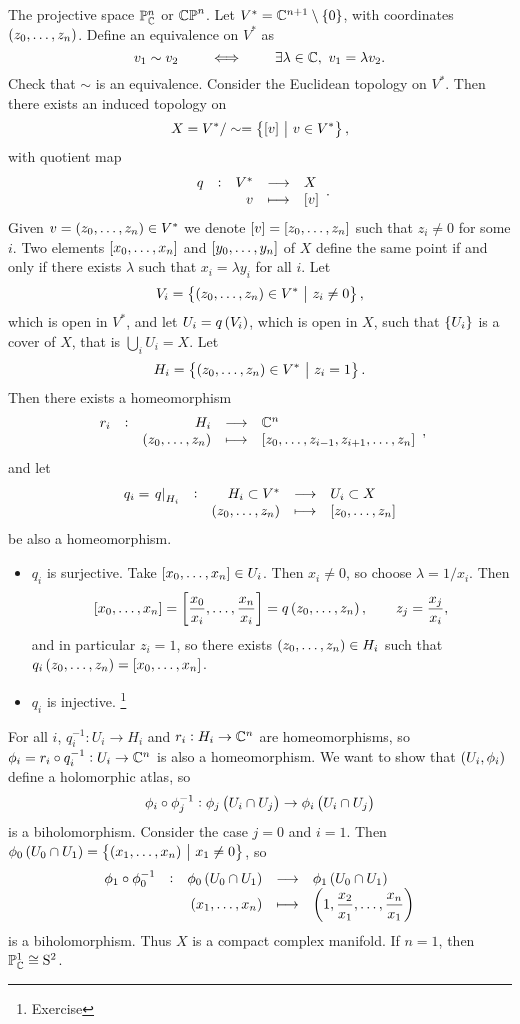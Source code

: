 \begin{example}
The projective space $ \mathbb{P}_{\mathbb{C}}^n $ or $ \mathbb{CP}^n $. Let $ V^* = \CC^{n + 1} \setminus \cbr{0} $, with coordinates $ \br{z_0, \dots, z_n} $. Define an equivalence on $ V^* $ as
$$ v_1 \sim v_2 \qquad \iff \qquad \exists \lambda \in \mathbb{C}, \ v_1 = \lambda v_2. $$
Check that $ \sim $ is an equivalence. Consider the Euclidean topology on $ V^* $. Then there exists an induced topology on
$$ X = V^* / \sim = \cbr{\sbr{v} \st v \in V^*}, $$
with quotient map
$$ \function[q]{V^*}{X}{v}{\sbr{v}}. $$
Given $ v = \br{z_0, \dots, z_n} \in V^* $ we denote $ \sbr{v} = \sbr{z_0, \dots, z_n} $ such that $ z_i \ne 0 $ for some $ i $. Two elements $ \sbr{x_0, \dots, x_n} $ and $ \sbr{y_0, \dots, y_n} $ of $ X $ define the same point if and only if there exists $ \lambda $ such that $ x_i = \lambda y_i $ for all $ i $. Let
$$ V_i = \cbr{\br{z_0, \dots, z_n} \in V^* \st z_i \ne 0}, $$
which is open in $ V^* $, and let $ U_i = q\br{V_i} $, which is open in $ X $, such that $ \cbr{U_i} $ is a cover of $ X $, that is $ \bigcup_i U_i = X $. Let
$$ H_i = \cbr{\br{z_0, \dots, z_n} \in V^* \st z_i = 1}. $$
Then there exists a homeomorphism
$$ \function[r_i]{H_i}{\CC^n}{\br{z_0, \dots, z_n}}{\sbr{z_0, \dots, z_{i - 1}, z_{i + 1}, \dots, z_n}}, $$
and let
$$ \function[q_i = \eval{q}_{H_i}]{H_i \subset V^*}{U_i \subset X}{\br{z_0, \dots, z_n}}{\sbr{z_0, \dots, z_n}} $$
be also a homeomorphism.

\pagebreak

\begin{itemize}
\item $ q_i $ is surjective. Take $ \sbr{x_0, \dots, x_n} \in U_i $. Then $ x_i \ne 0 $, so choose $ \lambda = 1 / x_i $. Then
$$ \sbr{x_0, \dots, x_n} = \sbr{\dfrac{x_0}{x_i}, \dots, \dfrac{x_n}{x_i}} = q\br{z_0, \dots, z_n}, \qquad z_j = \dfrac{x_j}{x_i}, $$
and in particular $ z_i = 1 $, so there exists $ \br{z_0, \dots, z_n} \in H_i $ such that $ q_i\br{z_0, \dots, z_n} = \sbr{x_0, \dots, x_n} $.
\item $ q_i $ is injective. \footnote{Exercise}
\end{itemize}
For all $ i $, $ q_i^{-1} : U_i \to H_i $ and $ r_i : H_i \to \mathbb{C}^n $ are homeomorphisms, so $ \phi_i = r_i \circ q_i^{-1} : U_i \to \mathbb{C}^n $ is also a homeomorphism. We want to show that $ \br{U_i, \phi_i} $ define a holomorphic atlas, so
$$ \phi_i \circ \phi_j^{-1} : \phi_j\br{U_i \cap U_j} \to \phi_i\br{U_i \cap U_j} $$
is a biholomorphism. Consider the case $ j = 0 $ and $ i = 1 $. Then $ \phi_0\br{U_0 \cap U_1} = \cbr{\br{x_1, \dots, x_n} \st x_1 \ne 0} $, so
$$ \function[\phi_1 \circ \phi_0^{-1}]{\phi_0\br{U_0 \cap U_1}}{\phi_1\br{U_0 \cap U_1}}{\br{x_1, \dots, x_n}}{\br{1, \dfrac{x_2}{x_1}, \dots, \dfrac{x_n}{x_1}}} $$
is a biholomorphism. Thus $ X $ is a compact complex manifold. If $ n = 1 $, then $ \mathbb{P}_{\mathbb{C}}^1 \cong \mathrm{S}^2 $.
\end{example}

